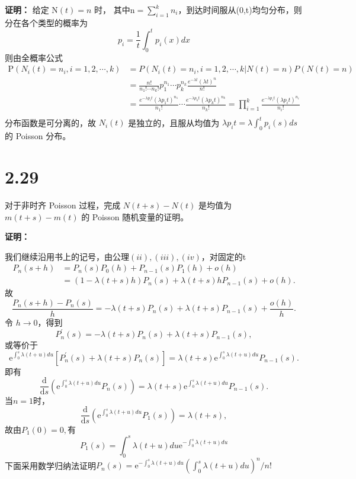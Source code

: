 \documentclass[12pt]{article}
\begin{document}
\textbf{证明：}
给定 $\mathrm{N} ( t )=n$ 时， 其中$\mathrm{n}=\sum_{i=1}^{k} n_{i}$，到达时间服从(0,t)均匀分布，则分在各个类型的概率为
$$
p_{i}=\frac{1} {t} \int_{0}^{t} p_{i} ( x ) d x 
$$
则由全概率公式
$$
\begin{aligned} {{\mathrm{P} ( N_{i} ( t )=n_{i} ,i=1,2,\cdots,k)}} & {} {} {}=P ( N_{i} ( t )=n_{i},i=1,2,\cdots,k | N ( t )=n ) P ( N ( t )=n )
\\
&={\frac{n!} {n_{1}! \cdots n_{k}!}} p_{1}^{n_{1}} \cdots p_{k}^{n_{k}} {\frac{e^{-\lambda t} ( \lambda t )^{n}} {n!}} \\ {{}} & {{} {{} {}={\frac{e^{-\lambda p_{i} t} ( \lambda p_{1} t )^{n_{1}}} {n_{1}!}} \cdots{\frac{e^{-\lambda p_{k} t} ( \lambda p_{k} t )^{n_{k}}} {n_{k}!}}=\prod_{i=1}^{k} {\frac{e^{-\lambda p_{i} t} ( \lambda p_{i} t )^{n_{i}}} {n_{i}!}}}} \\ \end{aligned} 
$$
分布函数是可分离的，故
$N_{i} ( t )$ 是独立的，且服从均值为 $\lambda p_{i}t=\lambda\int_{0}^{t} p_{i} ( s ) d s$ 的 Poisson 分布。

\section*{2.29}
对于非时齐 Poisson 过程，完成 $N(t + s) - N(t)$ 是均值为 $m(t + s) - m(t)$ 的 Poisson 随机变量的证明。

\textbf{证明：}

我们继续沿用书上的记号，由公理\((ii),(iii),(iv)\)，对固定的t
$$\begin{aligned}
P_{n}(s+h) & =P_{n}(s)P_{0}(h)+P_{n-1}(s)P_{1}(h)+o(h) \\
 & =(1-\lambda(t+s) h)P_{n}(s)+\lambda(t+s) hP_{n-1}(s)+o(h).
\end{aligned}$$
故$$\frac{P_n(s+h)-P_n(s)}{h}=-\lambda(t+s) P_n(s)+\lambda(t+s) P_{n-1}(s)+\frac{o(h)}{h}.$$
令 $h \to 0$，得到
$$P^{\prime}_n\left(s\right)=-\lambda(t+s) P_n\left(s\right)+\lambda(t+s) P_{n-1}\left(s\right),$$
或等价于
$$\mathrm{e}^{\int_0^s\lambda(t+u)du}\left[P_n^{\prime}(s)+\lambda(t+s) P_n(s)\right]=\lambda(t+s)\mathrm{e}^{\int_0^s\lambda(t+u)du}P_{n-1}(s).$$
即有
$$\frac{\mathrm{d}}{\mathrm{d}s}(\mathrm{e}^{\int_0^s\lambda(t+u)du }P_n(s))=\lambda(t+s)\mathrm{e}^{\int_0^s\lambda(t+u)du }P_{n-1}(s).$$
当\(n=1\)时，$$\frac{\mathrm{d}}{\mathrm{d}s}(\mathrm{e}^{\int_0^s\lambda(t+u)du }P_1(s))=\lambda(t+s),$$
故由\(P_1(0)=0,\)有 $$P_1\left(s\right)=\int_0^s\lambda(t+u)du \mathrm{e}^{-\int_0^s\lambda(t+u)du }$$
下面采用数学归纳法证明$P_n(s)=\mathrm{e}^{-\int_0^s\lambda(t+u)du }(\int_0^s\lambda(t+u)du)^n/n!$
\end{document}
